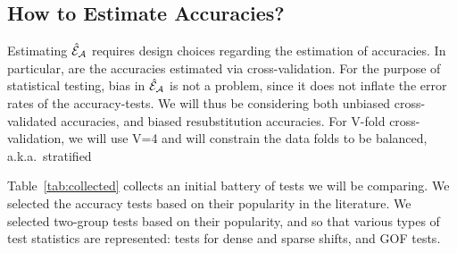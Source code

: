 \documentclass[oupdraft]{bio}
\begin{document}
\subsection{How to Estimate Accuracies?}
\label{sec:considerations}

Estimating $\hat{\mathcal{E}}_{\mathcal{A}}$ requires design choices regarding the estimation of accuracies. 
In particular, are the accuracies estimated via cross-validation. 
For the purpose of statistical testing, bias in $\hat{\mathcal{E}}_{\mathcal{A}}$ is not a problem, since  it does not inflate the error rates of the accuracy-tests. We will thus be considering both unbiased cross-validated accuracies, and biased resubstitution accuracies.
For V-fold cross-validation, we will use V=4 and will constrain the data folds to be  balanced, a.k.a.\ stratified



\bigskip

Table~\ref{tab:collected} collects an initial battery of tests we will be comparing. 
We selected the accuracy tests based on their popularity in the literature.
We selected two-group tests based on their popularity, and so that various types of test statistics are represented: tests for dense and sparse shifts, and GOF tests. 
\end{document}
